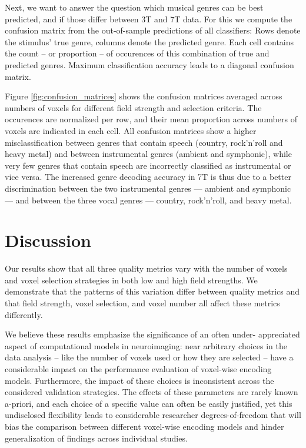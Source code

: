 Next, we want to answer the question which musical genres can be best predicted, and if those differ between 3T and 7T data. For this we compute the confusion matrix from the out-of-sample predictions of all classifiers: Rows denote the stimulus' true genre, columns denote the predicted genre. Each cell contains the count -- or proportion -- of occurences of this combination of true and predicted genres. Maximum classification accuracy leads to a diagonal confusion matrix.

Figure \ref{fig:confusion_matrices} shows the confusion matrices averaged across numbers of voxels for different field strength and selection criteria. The occurences are normalized per row, and their mean proportion across numbers of voxels are indicated in each cell. All confusion matrices show a higher misclassification between genres that contain speech (country, rock'n'roll and heavy metal) and between instrumental genres (ambient and symphonic), while very few genres that contain speech are incorrectly classified as instrumental or vice versa. The increased genre decoding accuracy in 7T is thus due to a better discrimination between the two instrumental genres --- ambient and symphonic --- and between the three vocal genres --- country, rock'n'roll, and heavy metal.

\section*{Discussion}

Our results show that all three quality metrics vary with the number of voxels and voxel selection strategies in both low and high field strengths. We demonstrate that the patterns of this variation differ between quality metrics and that field strength, voxel selection, and voxel number all affect these metrics differently.

We believe these results emphasize the significance of an often under- appreciated aspect of computational models in neuroimaging: near arbitrary choices in the data analysis -- like the number of voxels used or how they are selected -- have a considerable impact on the performance evaluation of voxel-wise encoding models. Furthermore, the impact of these choices is inconsistent across the considered validation strategies. The effects of these parameters are rarely known a-priori, and each choice of a specific value can often be easily justified, yet this undisclosed flexibility leads to considerable researcher degrees-of-freedom \citep{SNS11,hong2019false} that will bias the comparison between different voxel-wise encoding models and hinder generalization of findings across individual studies.

